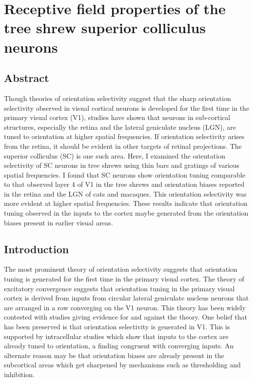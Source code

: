 \chapter{Receptive field properties of the tree shrew superior colliculus neurons} 
\pagebreak
\section{Abstract}

	Though theories of orientation selectivity suggest that the sharp orientation selectivity observed in visual cortical neurons is developed for the first time in the primary visual cortex (V1), studies have shown that neurons in sub-cortical structures, especially the retina and the lateral geniculate nucleus (LGN), are tuned to orientation at higher spatial frequencies. If orientation selectivity arises from the retina, it should be evident in other targets of retinal projections. The superior colliculus (SC) is one such area. Here, I examined the orientation selectivity of SC neurons in tree shrews using thin bars and gratings of various spatial frequencies. I found that SC neurons show orientation tuning comparable to that observed layer 4 of V1 in the tree shrews and orientation biases reported in the retina and the LGN of cats and macaques. This orientation selectivity was more evident at higher spatial frequencies. These results indicate that orientation tuning observed in the inputs to the cortex maybe generated from the orientation biases present in earlier visual areas.
	
\pagebreak

\section{Introduction}

	The most prominent theory of orientation selectivity suggests that orientation tuning is generated for the first time in the primary visual cortex. The theory of excitatory convergence suggests that orientation tuning in the primary visual cortex is derived from inputs from circular lateral geniculate nucleus neurons that are arranged in a row converging on the V1 neuron. This theory has been widely contested with studies giving evidence for and against the theory. One belief that has been preserved is that orientation selectivity is generated in V1. This is supported by intracellular studies which show that inputs to the cortex are already tuned to orientation, a finding congruent with converging inputs. An alternate reason may be that orientation biases are already present in the subcortical areas which get sharpened by mechanisms such as thresholding and inhibition.
	
